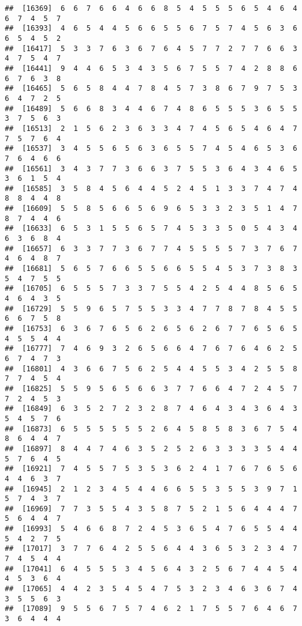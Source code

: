 \documentclass[
]{book}
\begin{document}
\begin{verbatim}
##  [16369]  6  6  7  6  6  4  6  6  8  5  4  5  5  5  6  5  4  6  4  6  7  4  5  7
##  [16393]  4  6  5  4  4  5  6  6  5  5  6  7  5  7  4  5  6  3  6  6  5  4  5  2
##  [16417]  5  3  3  7  6  3  6  7  6  4  5  7  7  2  7  7  6  6  3  4  7  5  4  7
##  [16441]  9  4  4  6  5  3  4  3  5  6  7  5  5  7  4  2  8  8  6  6  7  6  3  8
##  [16465]  5  6  5  8  4  4  7  8  4  5  7  3  8  6  7  9  7  5  3  6  4  7  2  5
##  [16489]  5  6  6  8  3  4  4  6  7  4  8  6  5  5  5  3  6  5  5  3  7  5  6  3
##  [16513]  2  1  5  6  2  3  6  3  3  4  7  4  5  6  5  4  6  4  7  7  5  7  6  4
##  [16537]  3  4  5  5  6  5  6  3  6  5  5  7  4  5  4  6  5  3  6  7  6  4  6  6
##  [16561]  3  4  3  7  7  3  6  6  3  7  5  5  3  6  4  3  4  6  5  3  6  1  5  4
##  [16585]  3  5  8  4  5  6  4  4  5  2  4  5  1  3  3  7  4  7  4  8  8  4  4  8
##  [16609]  5  5  8  5  6  6  5  6  9  6  5  3  3  2  3  5  1  4  7  8  7  4  4  6
##  [16633]  6  5  3  1  5  5  6  5  7  4  5  3  3  5  0  5  4  3  4  6  3  6  8  4
##  [16657]  6  3  3  7  7  3  6  7  7  4  5  5  5  5  7  3  7  6  7  4  6  4  8  7
##  [16681]  5  6  5  7  6  6  5  5  6  6  5  5  4  5  3  7  3  8  3  5  4  7  5  5
##  [16705]  6  5  5  5  7  3  3  7  5  5  4  2  5  4  4  8  5  6  5  4  6  4  3  5
##  [16729]  5  5  9  6  5  7  5  5  3  3  4  7  7  8  7  8  4  5  5  6  6  7  5  8
##  [16753]  6  3  6  7  6  5  6  2  6  5  6  2  6  7  7  6  5  6  5  4  5  5  4  4
##  [16777]  7  4  6  9  3  2  6  5  6  6  4  7  6  7  6  4  6  2  5  6  7  4  7  3
##  [16801]  4  3  6  6  7  5  6  2  5  4  4  5  5  3  4  2  5  5  8  7  7  4  5  4
##  [16825]  5  5  9  5  6  5  6  6  3  7  7  6  6  4  7  2  4  5  7  7  2  4  5  3
##  [16849]  6  3  5  2  7  2  3  2  8  7  4  6  4  3  4  3  6  4  3  5  4  5  7  6
##  [16873]  6  5  5  5  5  5  5  2  6  4  5  8  5  8  3  6  7  5  4  8  6  4  4  7
##  [16897]  8  4  4  7  4  6  3  5  2  5  2  6  3  3  3  3  5  4  4  5  7  6  4  5
##  [16921]  7  4  5  5  7  5  3  5  3  6  2  4  1  7  6  7  6  5  6  4  4  6  3  7
##  [16945]  2  1  2  3  4  5  4  4  6  6  5  5  3  5  5  3  9  7  1  5  7  4  3  7
##  [16969]  7  7  3  5  5  4  3  5  8  7  5  2  1  5  6  4  4  4  7  5  6  4  4  7
##  [16993]  5  4  6  6  8  7  2  4  5  3  6  5  4  7  6  5  5  4  4  5  4  2  7  5
##  [17017]  3  7  7  6  4  2  5  5  6  4  4  3  6  5  3  2  3  4  7  7  4  5  4  4
##  [17041]  6  4  5  5  5  3  4  5  6  4  3  2  5  6  7  4  4  5  4  4  5  3  6  4
##  [17065]  4  4  2  3  5  4  5  4  7  5  3  2  3  4  6  3  6  7  4  3  5  5  6  3
##  [17089]  9  5  5  6  7  5  7  4  6  2  1  7  5  5  7  6  4  6  7  3  6  4  4  4

\end{verbatim}
\end{document}
